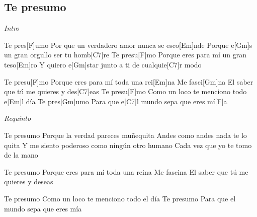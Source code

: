 \subsection{Te presumo}
\noindent

\vspace{1cm}

\begin{guitar}
	\begin{multicols}{2}
		\textit{Intro}
		\par

		Te pres[F]umo
		Por que un verdadero amor nunca se esco[Em]nde
		Porque e[Gm]s un gran orgullo ser tu homb[C7]re
		Te presu[F]mo
		Porque eres para mí un gran teso[Em]ro
		Y quiero e[Gm]star junto a ti de cualquie[C7]r modo

		Te presu[F]mo
		Porque eres para mí toda una rei[Em]na
		Me fasci[Gm]na
		El saber que tú me quieres y des[C7]eas
		Te presu[F]mo
		Como un loco te menciono todo e[Em]l día
		Te pres[Gm]umo
		Para que e[C7]l mundo sepa que eres mí[F]a

		\par
		\textit{Requinto}
		\par

		Te presumo
		Porque la verdad pareces muñequita
		Andes como andes nada te lo quita
		Y me siento poderoso como ningún otro humano
		Cada vez que yo te tomo de la mano

		Te presumo
		Porque eres para mí toda una reina
		Me fascina
		El saber que tú me quieres y deseas

		Te presumo
		Como un loco te menciono todo el día
		Te presumo
		Para que el mundo sepa que eres mía

	\end{multicols}
\end{guitar}

